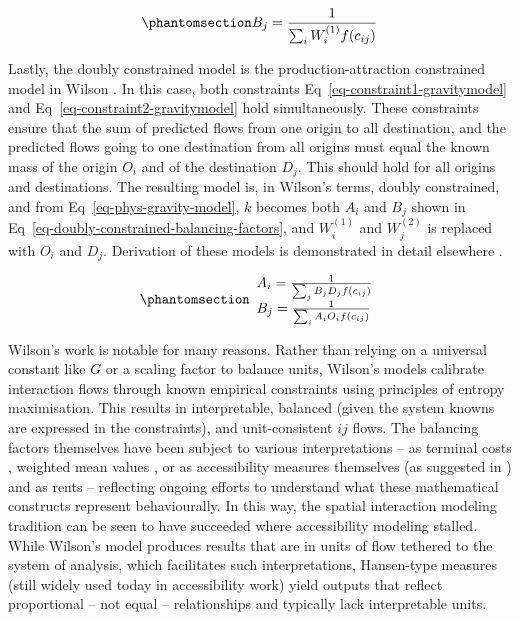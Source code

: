 \documentclass[
  10pt,
  letterpaper,
]{article}
\begin{document}
\begin{equation}\phantomsection\label{eq-attraction-constrained-balancing-factor}{
B_j = \frac{1}{\sum_i W_i^{(1)} f(c_{ij})}
}\end{equation}

Lastly, the doubly constrained model is the production-attraction
constrained model in Wilson \citep{wilson1971}. In this case, both
constraints Eq~\ref{eq-constraint1-gravitymodel} and
Eq~\ref{eq-constraint2-gravitymodel} hold simultaneously. These
constraints ensure that the sum of predicted flows from one origin to
all destination, and the predicted flows going to one destination from
all origins must equal the known mass of the origin \(O_i\) and of the
destination \(D_j\). This should hold for all origins and destinations.
The resulting model is, in Wilson's terms, doubly constrained, and from
Eq~\ref{eq-phys-gravity-model}, \(k\) becomes both \(A_i\) and \(B_j\)
shown in Eq~\ref{eq-doubly-constrained-balancing-factors}, and
\(W_i^{(1)}\) and \(W_j^{(2)}\) is replaced with \(O_i\) and \(D_j\).
Derivation of these models is demonstrated in detail elsewhere
\citep[e.g.,][]{ortuzar_2011_modelling, wilsonSTATISTICALTHEORYSPATIAL1967}.

\begin{equation}\phantomsection\label{eq-doubly-constrained-balancing-factors}{
\begin{array}{l}
A_i = \frac{1}{\sum_j B_j D_j f(c_{ij})}\\
B_j = \frac{1}{\sum_i A_i O_i f(c_{ij})}
\end{array}
}\end{equation}

Wilson's work is notable for many reasons. Rather than relying on a
universal constant like \(G\) or a scaling factor to balance units,
Wilson's models calibrate interaction flows through known empirical
constraints using principles of entropy maximisation. This results in
interpretable, balanced (given the system knowns are expressed in the
constraints), and unit-consistent \(ij\) flows. The balancing factors
themselves have been subject to various interpretations -- as terminal
costs \citep{dieter1962distribution}, weighted mean values
\citep{kirbyNormalizingFactorsGravity1970}, or as accessibility measures
themselves \citep{cesario1977new} (as suggested in \citet{Wilson1971})
and as rents \citep{morphetGravityModelCalibration2023} -- reflecting
ongoing efforts to understand what these mathematical constructs
represent behaviourally. In this way, the spatial interaction modeling
tradition can be seen to have succeeded where accessibility modeling
stalled. While Wilson's model produces results that are in units of flow
tethered to the system of analysis, which facilitates such
interpretations, Hansen-type measures (still widely used today in
accessibility work) yield outputs that reflect proportional -- not equal
-- relationships and typically lack interpretable units.
\end{document}
